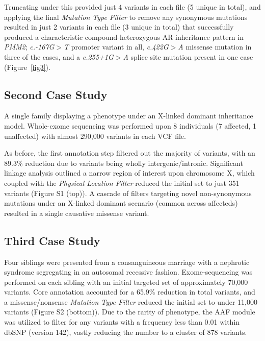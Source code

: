 \documentclass[twocolumn]{bmcart}%
\begin{document}
Truncating under this provided just 4 variants in each file (5 unique in total), and applying the final \textit{Mutation Type Filter} to remove any synonymous mutations resulted in just 2 variants in each file (3 unique in total) that successfully produced a characteristic compound-heterozygous AR inheritance pattern in \textit{PMM2}; \textit{c.-167G}$>$\textit{T} promoter variant in all, \textit{c.422G}$>$\textit{A} missense mutation in three of the cases, and a \textit{c.255+1G}$>$\textit{A} splice site mutation present in one case (Figure~\ref{fig3}).



\subsection*{Second Case Study}
A  single  family  displaying  a  phenotype  under  an  X-linked dominant inheritance model. Whole-exome sequencing was performed upon 8 individuals (7 affected, 1 unaffected) with almost 290,000  variants in each VCF file. 

As before, the first annotation step filtered out the majority of variants, with an 89.3\% reduction due to variants being wholly intergenic/intronic. Significant linkage  analysis  outlined  a  narrow  region  of  interest upon chromosome X, which coupled with the \textit{Physical Location Filter} reduced the initial set to just 351 variants (Figure S1 (top)). A cascade of filters targeting novel  non-synonymous  mutations  under  an  X-linked dominant scenario (common across affecteds) resulted in a single causative missense variant.


\subsection*{Third Case Study}

Four siblings were presented from a consanguineous marriage with a nephrotic syndrome segregating in an autosomal recessive fashion. Exome-sequencing was
performed on each sibling with an initial targeted set of approximately 70,000 variants. Core annotation accounted for a 65.9\% reduction in total variants, and a missense/nonsense \textit{Mutation Type Filter} reduced the initial set to under 11,000 variants (Figure S2 (bottom)). Due to the rarity of phenotype, the AAF module was utilized to filter for any variants with a frequency less than 0.01 within dbSNP (version 142), vastly reducing the number to a cluster of 878 variants.
\end{document}
